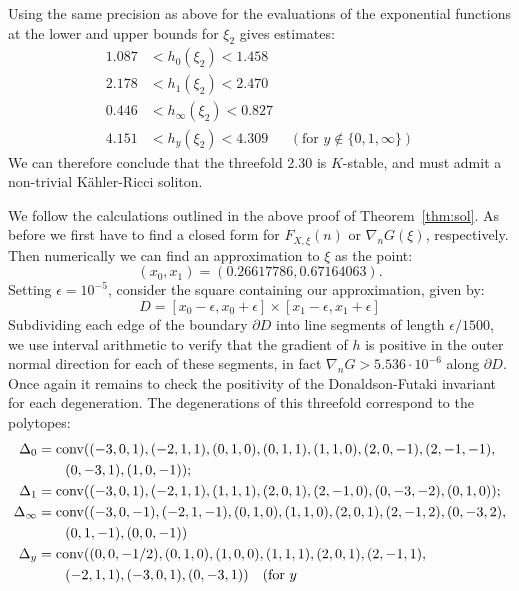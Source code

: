 \begin{example}
Using the same precision as above for the  evaluations of the exponential functions at the lower and upper bounds for \(\xi_2\) gives estimates:
\begin{align*}
1.087 &< h_0(\xi_2) < 1.458 \\
2.178 &< h_1(\xi_2) < 2.470 \\
0.446 &< h_\infty(\xi_2) < 0.827 \\
4.151 &< h_y(\xi_2) < 4.309 \ \ \ \ \ \ \   \left( \text{for } y \not \in \{0,1,\infty\} \right)
\end{align*}
We can therefore conclude that the threefold 2.30 is \(K\)-stable, and must admit a non-trivial K\"ahler-Ricci soliton.
\end{example}

\begin{example}
\label{ex:assym}
We follow the calculations outlined in the above proof of Theorem~\ref{thm:sol}. As before we first have to find a closed form for $F_{X,\xi}(n)$ or $\nabla_n G(\xi)$, respectively. Then numerically we can find an approximation to \(\xi\) as the point:
\[
(x_0,x_1) = (0.26617786,  0.67164063).
\]
Setting \(\epsilon = 10^{-5}\), consider the square containing our approximation, given by:
\[
D = [x_0 - \epsilon,x_0+\epsilon] \times [x_1 - \epsilon, x_1 + \epsilon]
\]
Subdividing each edge of the boundary \(\partial D\) into line segments of length \(\epsilon/1500\), we use interval arithmetic to verify that the gradient of \(h\) is positive in the outer normal direction for each of these segments, in fact \(\nabla_n G > 5.536 \cdot 10^{-6}\) along \(\partial D\). Once again it remains to check the positivity of the Donaldson-Futaki invariant for each degeneration. The degenerations of this threefold correspond to the polytopes:
{
\
 \begin{align*}
\Delta_0 &= \conv((-3,0,1),(-2,1,1),(0,1,0),(0,1,1),(1,1,0),(2,0,-1),(2,-1,-1),\\
         &\qquad  (0,-3,1),(1,0,-1)); \\
\Delta_1 &= \conv((-3,0,1),(-2,1,1),(1,1,1),(2,0,1),(2,-1,0),(0,-3,-2),(0,1,0)); \\ 
\Delta_\infty &= \conv((-3,0,-1),(-2,1,-1),(0,1,0),(1,1,0),(2,0,1),(2,-1,2),(0,-3,2),\\
&\qquad (0,1,-1),(0,0,-1)) \\
\Delta_y &= \conv((0, 0, -1/2), (0, 1, 0), (1, 0, 0), (1, 1, 1), (2, 0, 1), (2, -1, 1), \\ & \qquad (-2, 1, 1), (-3, 0, 1), (0, -3, 1)) \ \ \  ( \text{for } y 

\end{align*}}
\end{example}
